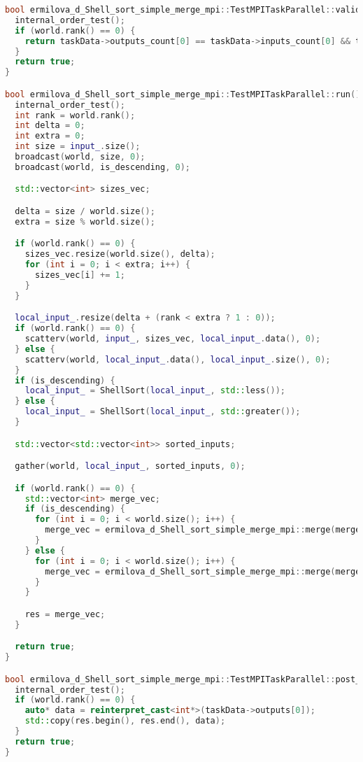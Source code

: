 \documentclass[a4paper,12pt]{article}
\begin{document}
\begin{lstlisting}[language=C++,caption={Параллельная версия }]
bool ermilova_d_Shell_sort_simple_merge_mpi::TestMPITaskParallel::validation() {
  internal_order_test();
  if (world.rank() == 0) {
    return taskData->outputs_count[0] == taskData->inputs_count[0] && taskData->inputs_count[0] > 0;
  }
  return true;
}

bool ermilova_d_Shell_sort_simple_merge_mpi::TestMPITaskParallel::run() {
  internal_order_test();
  int rank = world.rank();
  int delta = 0;
  int extra = 0;
  int size = input_.size();
  broadcast(world, size, 0);
  broadcast(world, is_descending, 0);

  std::vector<int> sizes_vec;

  delta = size / world.size();
  extra = size % world.size();

  if (world.rank() == 0) {
    sizes_vec.resize(world.size(), delta);
    for (int i = 0; i < extra; i++) {
      sizes_vec[i] += 1;
    }
  }

  local_input_.resize(delta + (rank < extra ? 1 : 0));
  if (world.rank() == 0) {
    scatterv(world, input_, sizes_vec, local_input_.data(), 0);
  } else {
    scatterv(world, local_input_.data(), local_input_.size(), 0);
  }
  if (is_descending) {
    local_input_ = ShellSort(local_input_, std::less());
  } else {
    local_input_ = ShellSort(local_input_, std::greater());
  }

  std::vector<std::vector<int>> sorted_inputs;

  gather(world, local_input_, sorted_inputs, 0);

  if (world.rank() == 0) {
    std::vector<int> merge_vec;
    if (is_descending) {
      for (int i = 0; i < world.size(); i++) {
        merge_vec = ermilova_d_Shell_sort_simple_merge_mpi::merge(merge_vec, sorted_inputs[i], std::greater());
      }
    } else {
      for (int i = 0; i < world.size(); i++) {
        merge_vec = ermilova_d_Shell_sort_simple_merge_mpi::merge(merge_vec, sorted_inputs[i], std::less());
      }
    }

    res = merge_vec;
  }

  return true;
}

bool ermilova_d_Shell_sort_simple_merge_mpi::TestMPITaskParallel::post_processing() {
  internal_order_test();
  if (world.rank() == 0) {
    auto* data = reinterpret_cast<int*>(taskData->outputs[0]);
    std::copy(res.begin(), res.end(), data);
  }
  return true;
}

\end{lstlisting}
\end{document}

